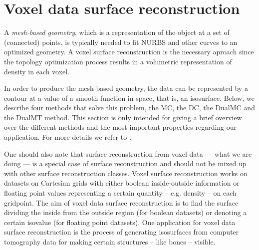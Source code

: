 \section{Voxel data surface reconstruction}
\label{sec:surfaceBackg}
A \emph{mesh-based geometry}, which is a representation of the object at a set of (connected) points, is typically needed to fit \ac{NURBS} and other curves to an optimized geometry. A voxel surface reconstruction is the necessary aproach since the topology optimization process results in a volumetric representation of density in each voxel. 

In order to produce the mesh-based geometry, the data can be represented by a contour at a value of a smooth function in space, that is, an isosurface. Below, we describe four methods that solve this problem, the \acl{MC}, the \acl{DC}, the \acl{DualMC} and the \acl{DualMT} method. This section is only intended for giving a brief overview over the different methods and the most important properties regarding our application. For more details we refer to \cite{Marching2006, Hermite2002, Nielson2004, Nielson2008}. 

One should also note that surface reconstruction from voxel data --- what we are doing --- is a special case of surface reconstruction and should not be mixed up with other surface reconstruction classes. Voxel surface reconstruction works on datasets on Cartesian grids with either boolean inside-outside information or floating point values representing a certain quantity -- e.g. density -- on each gridpoint. The aim of voxel data surface reconstruction is to find the surface dividing the inside from the outside region (for boolean datasets) or denoting a certain isovalue (for floating point datasets). One application for voxel data surface reconstruction is the process of generating isosurfaces from computer tomography data for making certain structures -- like bones -- visible.






